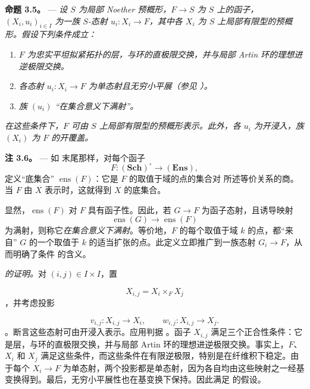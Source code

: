 \medskip\noindent{}\textbf{命题 3.5。} --- \textit{设 \(S\) 为局部 Noether 预概形，\(F\to S\) 为 \(S\) 上的函子，\((X_i,u_i)_{i\in I}\) 为一族 \(S\)-态射 \(u_i:X_i\to F\)，其中各 \(X_i\) 为 \(S\) 上局部有限型的预概形。假设下列条件成立：}

\begin{enumerate}\item[(a)]\textit{\(F\) 为忠实平坦拟紧拓扑的层，与环的直极限交换，并与局部 Artin 环的理想进逆极限交换。}

\item[(b)]\textit{各态射 \(u_i:X_i\to F\) 为单态射且无穷小平展（参见 ）。}

\item[(c)]\textit{族 \((u_i)\) “在集合意义下满射”。}\end{enumerate}

\textit{在这些条件下，\(F\) 可由 \(S\) 上局部有限型的预概形表示。此外，各 \(u_i\) 为开浸入，族 \((X_i)\) 为 \(F\) 的开覆盖。}

\medskip\noindent{}\textbf{注 3.6。} --- 如  末尾那样，对每个函子 \[
  F:(\mathbf{Sch})^\circ\longrightarrow(\mathbf{Ens}),
\] 定义“底集合” \(\operatorname{ens}(F)\)：它是 \(F\) 的取值于域的点的集合对  所述等价关系的商。当 \(F\) 由 \(X\) 表示时，这就得到 \(X\) 的底集合。

显然，\(\operatorname{ens}(F)\) 对 \(F\) 具有函子性。因此，若 \(G\to F\) 为函子态射，且诱导映射 \[
  \operatorname{ens}(G)\longrightarrow\operatorname{ens}(F)
\] 为满射，则称它\emph{在集合意义下满射}。等价地，\(F\) 的每个取值于域 \(k\) 的点，都“来自” \(G\) 的一个取值于 \(k\) 的适当扩张的点。此定义立即推广到一族态射 \(G_i\to F\)，从而明确了条件  的含义。

\medskip\noindent\textit{ 的证明。}对 \((i,j)\in I\times I\)，置

 \[
  X_{i,j}=X_i\times_F X_j
\]，并考虑投影

 \[
  v_{i,j}:X_{i,j}\longrightarrow X_i,
  \qquad
  w_{i,j}:X_{i,j}\longrightarrow X_j.
\]。断言这些态射可由开浸入表示。应用判据 。函子 \(X_{i,j}\) 满足三个正合性条件：它是层，与环的直极限交换，并与局部 Artin 环的理想进逆极限交换。事实上，\(F\)、\(X_i\) 和 \(X_j\) 满足这些条件，而这些条件在有限逆极限，特别是在纤维积下稳定。由于每个 \(X_i\to F\) 为单态射，两个投影都是单态射，因为各自均由这些映射之一经基变换得到。最后，无穷小平展性也在基变换下保持。因此满足  的假设。

